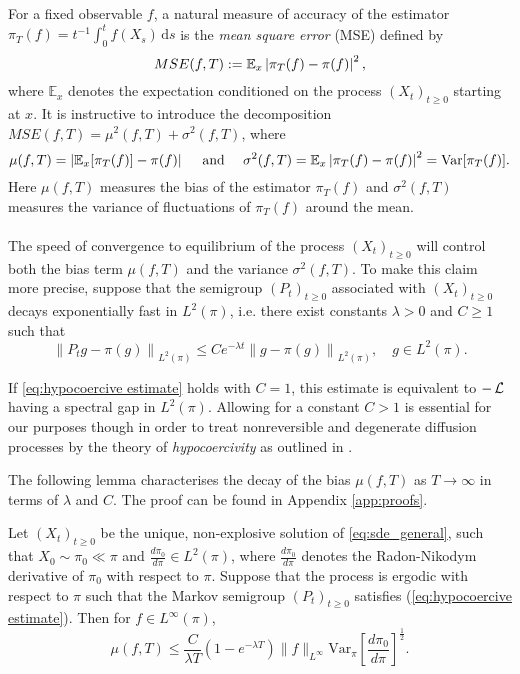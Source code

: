 For a fixed observable $f$, a natural measure of accuracy of the estimator $\pi_T(f) = t^{-1}\int_0^{t}f(X_s)\,\mathrm{d}s$ is the \emph{mean square error} (MSE) defined by
\begin{equation}
\label{eq:mse}
MSE(f, T) := \mathbb{E}_{x}\left|{\pi_T(f) - \pi(f)}\right|^2,
\end{equation}
where $\mathbb{E}_{x}$ denotes the expectation conditioned on the process $(X_t)_{t\ge0}$ starting at $x$.  
It is instructive to introduce the decomposition $MSE(f, T) = \mu^2(f, T) + \sigma^2(f, T)$, where
\begin{equation}
\label{eq:bias_variance_decomposition}
  \mu(f, T) = \left|{\mathbb{E}_{x}[\pi_T(f)] - \pi(f)}\right|\quad\mbox{ and }\quad \sigma^2(f, T) = \mathbb{E}_{x}\left|{\pi_T(f) - \pi(f)}\right|^2 = \mbox{Var}[\pi_T(f)].
\end{equation}
Here $\mu(f, T)$ measures the bias of the estimator $\pi_T(f)$ and $\sigma^2(f, T)$ measures the variance of fluctuations of $\pi_T(f)$ around the mean.   
\\\\
The speed of convergence to equilibrium of the process $(X_t)_{t\ge0}$ will control both the bias term $\mu(f, T)$ and the variance $\sigma^2(f, T)$.  To make this claim more precise, suppose that the semigroup $(P_t)_{t\ge0}$ associated with $(X_t)_{t\ge0}$ decays exponentially fast in $L^2(\pi)$, i.e. there exist constants  $\lambda > 0$ and $C\ge1$ such that
\begin{equation}
\label{eq:hypocoercive estimate}
 \left\lVert P_t g - \pi(g) \right\rVert_{L^2(\pi)} \leq C e^{- \lambda t} \left\lVert g-\pi(g) \right\rVert_{L^2(\pi)},\quad g\in L^2(\pi).
\end{equation}
\begin{remark}
	If \eqref{eq:hypocoercive estimate} holds with $C=1$, this estimate is equivalent to $-\operatorname{\mathcal{L}}$ having a spectral gap in $L^2(\pi)$. Allowing for a constant $C>1$ is essential for our purposes though in order to treat nonreversible and degenerate diffusion processes by the theory of \emph{hypocoercivity} as outlined in \cite{villani2009hypocoercivity}.  
\end{remark}
The following lemma characterises the decay of the bias $\mu(f,T)$ as $T\rightarrow \infty$ in terms of $\lambda$ and $C$.  The proof can be found in Appendix \ref{app:proofs}.
\begin{lemma}
\label{lemma:bias}
Let $(X_t)_{t\geq 0}$ be the unique, non-explosive solution of \eqref{eq:sde_general}, such that $X_0 \sim \pi_0 \ll \pi$ and $\frac{d\pi_0}{d\pi} \in L^2(\pi)$, where $\frac{d\pi_0}{d\pi}$ denotes the Radon-Nikodym derivative of $\pi_0$ with respect to $\pi$.  Suppose that the process is ergodic with respect to $\pi$ such that the Markov semigroup $(P_t)_{t\geq 0}$ satisfies (\ref{eq:hypocoercive estimate}).  Then for $f \in L^\infty(\pi)$,
\begin{equation*}
\mu(f, T)  \leq \frac{C}{\lambda T}\left({1 - e^{-\lambda T}}\right)\lVert f \rVert_{L^\infty}\mbox{Var}_{\pi}\left[\frac{d\pi_0}{d\pi}\right]^{\frac{1}{2}}.
\end{equation*}
\end{lemma}

